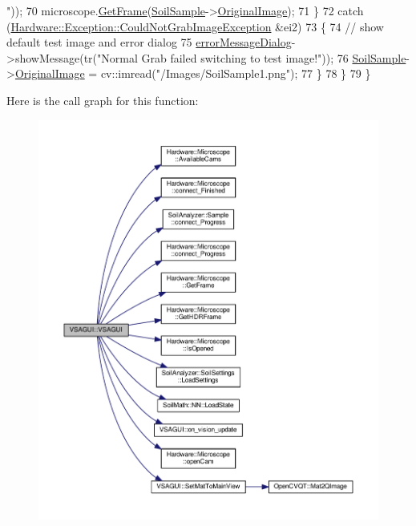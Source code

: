 \begin{DoxyCode}
{      "}));
70             microscope.\hyperlink{class_hardware_1_1_microscope_a1ec5c792320ae4db3f3b39830e74f880}{GetFrame}(\hyperlink{class_v_s_a_g_u_i_ac90517c9baea0a75455d43d5eb77d3e7}{SoilSample}->\hyperlink{class_soil_analyzer_1_1_sample_a0d6e6fca9e232a77329daf0b4b29c634}{OriginalImage});
71         \}
72         \textcolor{keywordflow}{catch} (\hyperlink{class_hardware_1_1_exception_1_1_could_not_grab_image_exception}{Hardware::Exception::CouldNotGrabImageException}
       &ei2)
73         \{
74             \textcolor{comment}{// show default test image and error dialog}
75             \hyperlink{class_v_s_a_g_u_i_af01408e987e5df2ce336ee8447841c1f}{errorMessageDialog}->showMessage(tr(\textcolor{stringliteral}{"Normal Grab failed switching to test
       image!"}));
76             \hyperlink{class_v_s_a_g_u_i_ac90517c9baea0a75455d43d5eb77d3e7}{SoilSample}->\hyperlink{class_soil_analyzer_1_1_sample_a0d6e6fca9e232a77329daf0b4b29c634}{OriginalImage} = cv::imread(\textcolor{stringliteral}{"/Images/SoilSample1.png"});
77         \}
78     \}
79 \}
\end{DoxyCode}


Here is the call graph for this function\+:\nopagebreak
\begin{figure}[H]
\begin{center}
\leavevmode
\includegraphics[width=350pt]{class_v_s_a_g_u_i_a987a20380023fe5985bd1fef0491af40_cgraph}
\end{center}
\end{figure}


